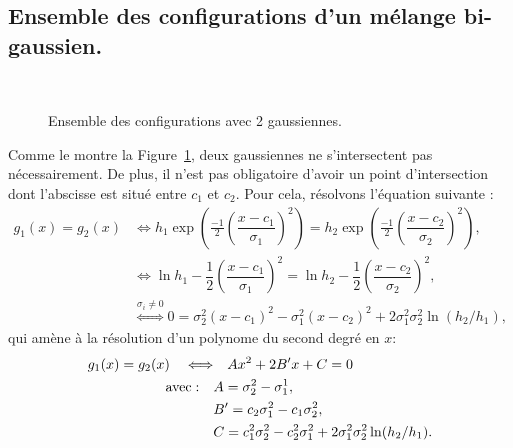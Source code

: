 \documentclass[main.tex]{subfiles}
\begin{document}
\subsection{Ensemble des configurations d'un mélange bi-gaussien.}
\begin{figure}
\qquad
{}\\
\qquad
{}
\caption{\label{fig:config_intersection_gaussienne}Ensemble des configurations avec 2 gaussiennes.}
\end{figure}

Comme le montre la Figure~\ref{fig:config_intersection_gaussienne}, deux gaussiennes ne s'intersectent pas nécessairement. De plus, il n'est pas obligatoire d'avoir un point d'intersection dont l'abscisse est situé entre $c_1$ et $c_2$. Pour cela, résolvons l'équation suivante :
\begin{align*}
g_1(x)=g_2(x) 
& \Leftrightarrow h_1\exp \left(\frac{-1}{2} \left( \dfrac{x-c_1}{\sigma_1}\right)^2  \right) = h_2\exp \left(\frac{-1}{2} \left( \dfrac{x-c_2}{\sigma_2}\right)^2  \right), \\
& \Leftrightarrow \ln h_1 - \dfrac{1}{2}\left( \dfrac{x-c_1}{\sigma_1} \right)^2 = \ln h_2 - \dfrac{1}{2}\left( \dfrac{x-c_2}{\sigma_2} \right)^2, \\
& \overset{\sigma_i \neq 0}{\Leftrightarrow} 0 = \sigma_2^2 (x-c_1)^2 - \sigma_1^2 (x-c_2)^2 + 2\sigma_1^2\sigma_2^2 \ln( h_2 / h_1 ),
\end{align*}
qui amène à la résolution d'un polynome du second degré en $x$:
\begin{equation}
\begin{aligned}
\label{eq:g1=g2}
g_1(x)=g_2(x) \quad \Longleftrightarrow & \quad  Ax^2 + 2B'x + C =0 \\
{\rm avec :} \quad &A=\sigma_2^2 - \sigma_1^1, \\
& B'=c_2\sigma_1^2-c_1\sigma_2^2,\\
& C= c_1^2\sigma_2^2-c_2^2\sigma_1^2 +  2\sigma_1^2\sigma_2^2 \ln( h_2 / h_1 ).
\end{aligned}
\end{equation}
\end{document}
